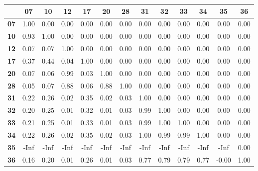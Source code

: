 \begin{tiny}\begin{tabular}{|l|c|c|c|c|c|c|c|c|c|c|c|c|}
\hline
&\textbf{07}&\textbf{10}&\textbf{12}&\textbf{17}&\textbf{20}&\textbf{28}&\textbf{31}&\textbf{32}&\textbf{33}&\textbf{34}&\textbf{35}&\textbf{36}\\\hline
\textbf{07}&1.00&0.00&0.00&0.00&0.00&0.00&0.00&0.00&0.00&0.00&0.00&0.00\\\hline
\textbf{10}&0.93&1.00&0.00&0.00&0.00&0.00&0.00&0.00&0.00&0.00&0.00&0.00\\\hline
\textbf{12}&0.07&0.07&1.00&0.00&0.00&0.00&0.00&0.00&0.00&0.00&0.00&0.00\\\hline
\textbf{17}&0.37&0.44&0.04&1.00&0.00&0.00&0.00&0.00&0.00&0.00&0.00&0.00\\\hline
\textbf{20}&0.07&0.06&0.99&0.03&1.00&0.00&0.00&0.00&0.00&0.00&0.00&0.00\\\hline
\textbf{28}&0.05&0.07&0.88&0.06&0.88&1.00&0.00&0.00&0.00&0.00&0.00&0.00\\\hline
\textbf{31}&0.22&0.26&0.02&0.35&0.02&0.03&1.00&0.00&0.00&0.00&0.00&0.00\\\hline
\textbf{32}&0.20&0.25&0.01&0.32&0.01&0.03&0.99&1.00&0.00&0.00&0.00&0.00\\\hline
\textbf{33}&0.21&0.25&0.01&0.33&0.01&0.03&0.99&1.00&1.00&0.00&0.00&0.00\\\hline
\textbf{34}&0.22&0.26&0.02&0.35&0.02&0.03&1.00&0.99&0.99&1.00&0.00&0.00\\\hline
\textbf{35}&-Inf&-Inf&-Inf&-Inf&-Inf&-Inf&-Inf&-Inf&-Inf&-Inf&-Inf&0.00\\\hline
\textbf{36}&0.16&0.20&0.01&0.26&0.01&0.03&0.77&0.79&0.79&0.77&-0.00&1.00\\\hline
\end{tabular}
\end{tiny}